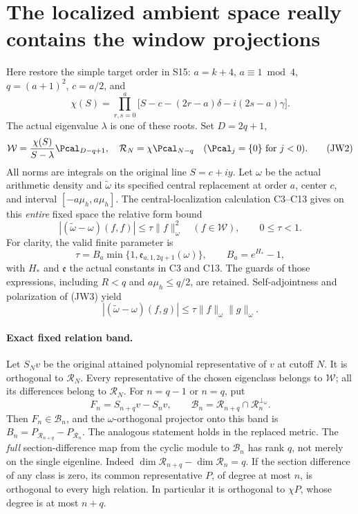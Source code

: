 \documentclass[11pt,a4paper]{article}
\begin{document}
\section{The localized ambient space really contains the window projections}

Here restore the simple target order in S15: \(a=k+4\),
\(a\equiv1\bmod4\), \(q=(a+1)^2\), \(c=a/2\), and
\[
\chi(S)=\prod_{r,s=0}^{a}
\bigl[S-c-(2r-a)\delta-i(2s-a)\gamma\bigr].
\tag{JW1}
\]
The actual eigenvalue \(\lambda\) is one of these roots.
Set \(D=2q+1\),
\[
\mathcal W=\frac{\chi(S)}{S-\lambda}\Pcal_{D-q+1},
\quad
\mathcal R_N=\chi\Pcal_{N-q}
\quad (\Pcal_j=\{0\}\text{ for }j<0).
\tag{JW2}
\]
All norms are integrals on the original line \(S=c+iy\).
Let \(\omega\) be the actual arithmetic density and
\(\widetilde\omega\) its specified central replacement at order \(a\),
center \(c\), and interval \([-a\mu_h,a\mu_h]\).
The central-localization calculation C3--C13 gives on this \emph{entire}
fixed space the relative form bound
\[
|(\widetilde\omega-\omega)(f,f)|\le\tau\|f\|_\omega^2
\quad(f\in\mathcal W),\qquad 0\le\tau<1.
\tag{JW3}
\]
For clarity, the valid finite parameter is
\[
\tau=B_a\min\{1,\mathfrak e_{a,1,2q+1}(\omega)\},
\qquad
B_a=e^{H_*}-1,
\tag{JW4}
\]
with \(H_*\) and \(\mathfrak e\) the actual constants in C3 and C13.
The guards of those expressions, including \(R<q\) and \(a\mu_h\le q/2\),
are retained.  Self-adjointness and polarization of (JW3) yield
\[
|(\widetilde\omega-\omega)(f,g)|
\le\tau\|f\|_\omega\|g\|_\omega.
\tag{JW5}
\]

\paragraph{Exact fixed relation band.}
Let \(S_Nv\) be the original attained polynomial representative of \(v\)
at cutoff \(N\).  It is orthogonal to \(\mathcal R_N\).
Every representative of the chosen eigenclass belongs to \(\mathcal W\);
all its differences belong to \(\mathcal R_N\).
For \(n=q-1\) or \(n=q\), put
\[
F_n=S_{n+q}v-S_nv,\qquad
\mathcal B_n=\mathcal R_{n+q}\cap\mathcal R_n^{\perp_\omega}.
\tag{JW6}
\]
Then \(F_n\in\mathcal B_n\), and the \(\omega\)-orthogonal projector onto
this band is \(B_n=P_{\mathcal R_{n+q}}-P_{\mathcal R_n}\).
The analogous statement holds in the replaced metric.
The \emph{full} section-difference map from the cyclic module to
\(\mathcal B_n\) has rank \(q\), not merely on the single eigenline.
Indeed
\(\dim\mathcal R_{n+q}-\dim\mathcal R_n=q\).
If the section difference of any class is zero, its common representative
\(P\), of degree at most \(n\), is orthogonal to every high relation.
In particular it is orthogonal to \(\chi P\), whose degree is at most
\(n+q\).
\end{document}
